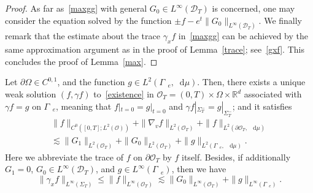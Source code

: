 \documentclass[10pt]{amsart}
\theoremstyle{definition}\newtheorem{defi}[theo]{Definition}\newtheorem{rema}[theo]{Remark}\newtheorem{exam}[theo]{Example}\newtheorem{exem}[theo]{Example}\newtheorem{nota}[theo]{Notation}
\newcommand*{\dif}{\mathop{}\!\mathrm{d}}
\newcommand*\p{\partial}
\newcommand*\R {\mathbb{R}}
\newcommand*\Ge {\Gamma_{\;\!\!\;\!\!e}}
\newcommand*\D {\mathcal{D}}
\newcommand*\OO {\mathcal{O}}
\begin{document}
\begin{proof}
As far as~\eqref{maxgg} with general $G_0\in L^\infty(\D_T)$ is concerned, one may consider the equation solved by the function $\pm f-e^{t}\|G_0\|_{L^\infty(\D_T)}$. We finally remark that the estimate about the trace $\gamma_xf$ in~\eqref{maxgg} can be achieved by the same approximation argument as in the proof of Lemma~\ref{trace}; see~\eqref{gxf}. This concludes the proof of Lemma~\ref{max}.
\end{proof}

\begin{coro}\label{globalin}
Let $\p\Omega\in C^{0,1}$, and the function $g\in L^2(\Ge,\dif\mu)$. Then, there exists a unique weak solution $(f,\gamma f)$ to~\eqref{existence} in $\OO_T=(0,T)\times\Omega\times\R^d$ associated with $\gamma f=g$ on $\Ge$, meaning that $f|_{t=0}=g|_{t=0}$ and $\gamma f|_{\Sigma_T^-}=g|_{\Sigma_T^-}$; and it satisfies
\begin{multline}\label{FPenergy}
\|f\|_{C^0\left([0,T];L^2(\OO)\right)} +\|\nabla_vf\|_{L^2(\OO_T)} +\|f\|_{L^2\left(\p\OO_T,\;\!\dif\mu\right)}\\
\lesssim \|G_1\|_{L^2(\OO_T)} + \|G_0\|_{L^2(\OO_T)} +\|g\|_{L^2\left(\Ge,\;\!\dif\mu\right)}.
\end{multline}
Here we abbreviate the trace of $f$ on $\p\OO_T$ by $f$ itself. Besides, if additionally $G_1=0$, $G_0\in L^\infty(\D_T)$, and $g\in L^\infty(\Ge)$, then we have
\begin{equation}\label{maxglobal}
\|\gamma_xf\|_{L^\infty(\Sigma_T)}
\le\|f\|_{L^\infty(\OO_T)}
\lesssim \|G_0\|_{L^\infty(\OO_T)} +\|g\|_{L^\infty(\Ge)}.
\end{equation}
\end{coro}
\end{document}
